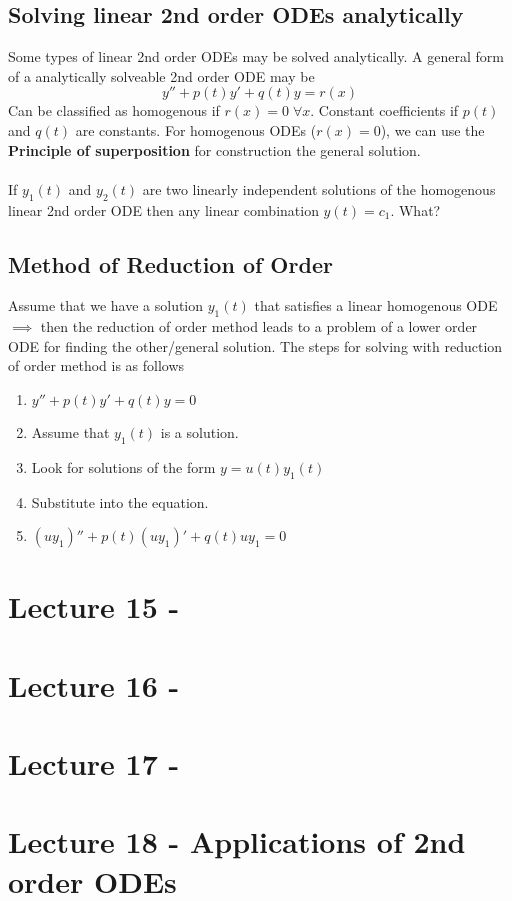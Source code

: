 \documentclass[a6paper]{article}
\theoremstyle{definition}
\theoremstyle{plain}
\theoremstyle{remark}
\begin{document}
\subsection{Solving linear 2nd order ODEs analytically}
Some types of linear 2nd order ODEs may be solved analytically. A general form
of a analytically solveable 2nd order ODE may be
$$ y'' + p(t) y' + q(t) y = r(x) $$
Can be classified as homogenous if $ r(x) = 0 \; \forall x $. Constant
coefficients if $ p(t)  $ and $ q(t) $ are constants. For homogenous ODEs
($ r(x) = 0 $), we can use the \textbf{Principle of superposition} for
construction the general solution.
\\\\
If $ y_1(t) $ and $ y_2(t) $ are two linearly independent solutions of the
homogenous linear 2nd order ODE then any linear combination $ y(t) = c_1 $.
What?
\subsection{Method of Reduction of Order}
Assume that we have a solution $ y_1(t) $ that satisfies a linear homogenous
ODE $ \implies $ then the reduction of order method leads to a problem of
a lower order ODE for finding the other/general solution. The steps for solving
with reduction of order method is as follows
\begin{enumerate}
  \item $ y'' + p(t) y' + q(t) y = 0 $
  \item Assume that $ y_1 (t) $ is a solution.
  \item Look for solutions of the form $ y = u(t)y_1(t) $
  \item Substitute into the equation.
  \item $ (u y_1)'' + p(t) (u y_1)' + q(t) u y_1 = 0 $
\end{enumerate}
\section{Lecture 15 - }

\section{Lecture 16 - }
\section{Lecture 17 - }

\section{Lecture 18 - Applications of 2nd order ODEs}
\end{document}
